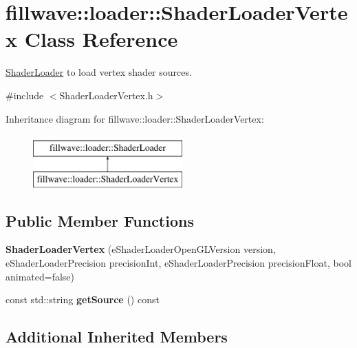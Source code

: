 \hypertarget{classfillwave_1_1loader_1_1ShaderLoaderVertex}{}\section{fillwave\+:\+:loader\+:\+:Shader\+Loader\+Vertex Class Reference}
\label{classfillwave_1_1loader_1_1ShaderLoaderVertex}


\hyperlink{classfillwave_1_1loader_1_1ShaderLoader}{Shader\+Loader} to load vertex shader sources.  




{\ttfamily \#include $<$Shader\+Loader\+Vertex.\+h$>$}

Inheritance diagram for fillwave\+:\+:loader\+:\+:Shader\+Loader\+Vertex\+:\begin{figure}[H]
\begin{center}
\leavevmode
\includegraphics[height=2.000000cm]{classfillwave_1_1loader_1_1ShaderLoaderVertex}
\end{center}
\end{figure}
\subsection*{Public Member Functions}
\begin{DoxyCompactItemize}
\item 
\hypertarget{classfillwave_1_1loader_1_1ShaderLoaderVertex_a3b1bd18fa1aa076f11d56b35d77b6d42}{}{\bfseries Shader\+Loader\+Vertex} (e\+Shader\+Loader\+Open\+G\+L\+Version version, e\+Shader\+Loader\+Precision precision\+Int, e\+Shader\+Loader\+Precision precision\+Float, bool animated=false)\label{classfillwave_1_1loader_1_1ShaderLoaderVertex_a3b1bd18fa1aa076f11d56b35d77b6d42}

\item 
\hypertarget{classfillwave_1_1loader_1_1ShaderLoaderVertex_ae8a74e3d0e75b1799c87f92df98994b2}{}const std\+::string {\bfseries get\+Source} () const \label{classfillwave_1_1loader_1_1ShaderLoaderVertex_ae8a74e3d0e75b1799c87f92df98994b2}

\end{DoxyCompactItemize}
\subsection*{Additional Inherited Members}


